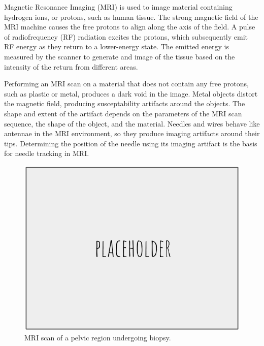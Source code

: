 Magnetic Resonance Imaging (MRI) is used to image material containing hydrogen ions, or protons, such as human tissue. The strong magnetic field of the MRI machine causes the free protons to align along the axis of the field. A pulse of radiofrequency (RF) radiation excites the protons, which subsequently emit RF energy as they return to a lower-energy state. The emitted energy is measured by the scanner to generate and image of the tissue based on the intensity of the return from different areas.

Performing an MRI scan on a material that does not contain any free protons, such as plastic or metal, produces a dark void in the image. Metal objects distort the magnetic field, producing susceptability artifacts around the objects. The shape and extent of the artifact depends on the parameters of the MRI scan sequence, the shape of the object, and the material. Needles and wires behave like antennae in the MRI environment, so they produce imaging artifacts around their tips\cite{lewin_needle_1996}. Determining the position of the needle using its imaging artifact is the basis for needle tracking in MRI\cite{song_biopsy_2012}.

\begin{figure}[h]
\includegraphics[width=1.0\textwidth]{Fig/placeholder.png}
\caption{MRI scan of a pelvic region undergoing biopsy.}
\label{fig:mri_human}
\end{figure}

